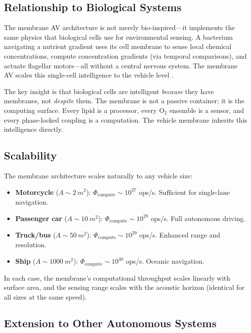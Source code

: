 \documentclass[12pt]{article}
\theoremstyle{definition}
\theoremstyle{remark}
\begin{document}
\subsection{Relationship to Biological Systems}

The membrane AV architecture is not merely bio-inspired---it implements the same physics that biological cells use for environmental sensing. A bacterium navigating a nutrient gradient uses its cell membrane to sense local chemical concentrations, compute concentration gradients (via temporal comparisons), and actuate flagellar motors---all without a central nervous system. The membrane AV scales this single-cell intelligence to the vehicle level \cite{sachikonye2025membrane}.

The key insight is that biological cells are intelligent \emph{because} they have membranes, not \emph{despite} them. The membrane is not a passive container; it is the computing surface. Every lipid is a processor, every $\mathrm{O}_2$ ensemble is a sensor, and every phase-locked coupling is a computation. The vehicle membrane inherits this intelligence directly.

\subsection{Scalability}

The membrane architecture scales naturally to any vehicle size:

\begin{itemize}
  \item \textbf{Motorcycle} ($A \sim \SI{2}{m^2}$): $\Phi_{\mathrm{compute}} \sim 10^{27}$ ops/s. Sufficient for single-lane navigation.
  \item \textbf{Passenger car} ($A \sim \SI{10}{m^2}$): $\Phi_{\mathrm{compute}} \sim 10^{28}$ ops/s. Full autonomous driving.
  \item \textbf{Truck/bus} ($A \sim \SI{50}{m^2}$): $\Phi_{\mathrm{compute}} \sim 10^{29}$ ops/s. Enhanced range and resolution.
  \item \textbf{Ship} ($A \sim \SI{1000}{m^2}$): $\Phi_{\mathrm{compute}} \sim 10^{30}$ ops/s. Oceanic navigation.
\end{itemize}

In each case, the membrane's computational throughput scales linearly with surface area, and the sensing range scales with the acoustic horizon (identical for all sizes at the same speed).

\subsection{Extension to Other Autonomous Systems}
\end{document}

